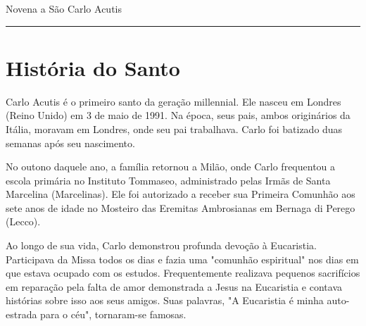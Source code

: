 \documentclass[a4paper,14pt]{extarticle} \usepackage[utf8]{inputenc}
\begin{document}
\begin{center}
  {\huge Novena a São Carlo Acutis}
\end{center}


\par\noindent\rule{\textwidth}{0.4pt}

\tableofcontents
\thispagestyle{empty}

\newpage

\section{História do Santo}

Carlo Acutis é o primeiro santo da geração millennial. Ele nasceu em Londres (Reino Unido) em 3 de maio de 1991. Na época, seus pais, ambos originários da Itália, moravam em Londres, onde seu pai trabalhava. Carlo foi batizado duas semanas após seu nascimento.

No outono daquele ano, a família retornou a Milão, onde Carlo frequentou a escola primária no Instituto Tommaseo, administrado pelas Irmãs de Santa Marcelina (Marcelinas). Ele foi autorizado a receber sua Primeira Comunhão aos sete anos de idade no Mosteiro das Eremitas Ambrosianas em Bernaga di Perego (Lecco).

Ao longo de sua vida, Carlo demonstrou profunda devoção à Eucaristia. Participava da Missa todos os dias e fazia uma "comunhão espiritual" nos dias em que estava ocupado com os estudos. Frequentemente realizava pequenos sacrifícios em reparação pela falta de amor demonstrada a Jesus na Eucaristia e contava histórias sobre isso aos seus amigos. Suas palavras, "A Eucaristia é minha auto-estrada para o céu", tornaram-se famosas.
\end{document}
